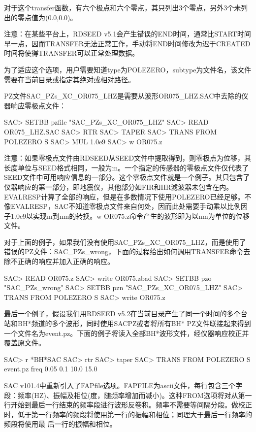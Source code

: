 对于这个transfer函数，有六个极点和六个零点，其只列出3个零点，另外3个未列出的零点值为(0.0,0.0)。

注意：在某些平台上，RDSEED v5.1会产生错误的END时间，通常比START时间早一点，因而TRANSFER无法正常工作，手动将END时间修改为迟于CREATED时间将使得TRANSFER可以正常处理数据。

为了适应这个选项，用户需要知道type为POLEZERO，subtype为文件名，该文件需要在当前目录或指定其绝对或相对路径。

PZ文件SAC\_PZs\_XC\_OR075\_LHZ是需要从波形OR075\_LHZ.SAC中去除的仪器响应零极点文件：
\begin{SACCode}
SAC> SETBB pzfile "SAC_PZs_XC_OR075_LHZ"
SAC> READ OR075_LHZ.SAC
SAC> RTR
SAC> TAPER
SAC> TRANS FROM POLEZERO S %
SAC> MUL 1.0e9
SAC> w OR075.z
\end{SACCode}
注意：如果零极点文件由RDSEED从SEED文件中提取得到，则零极点为位移，其长度单位与SEED格式相同，一般为m。一个指定的传感器的零极点文件仅代表了SEED文件中可用响应信息的一部分。这个零极点文件就是一个例子。其只包含了仪器响应的第一部分，即地震仪，其他部分如FIR和IIR滤波器未包含在内。EVALRESP计算了全部的响应，但是在多数情况下使用POLEZERO已经足够。不像EVALRESP，SAC不知道零极点文件来自何处，因而此处需要手动乘以比例因子1.0e9以实现m到nm的转换。w OR075.z命令产生的波形即为以nm为单位的位移文件。

对于上面的例子，如果我们没有使用SAC\_PZs\_XC\_OR075\_LHZ，而是使用了错误的PZ文件：SAC\_PZs\_wrong，下面的过程给出如何调用TRANSFER命令去除不正确的响应并加入正确的响应。
\begin{SACCode}
SAC> READ OR075.z
SAC> write OR075.zbad
SAC> SETBB pzo "SAC_PZs_wrong"
SAC> SETBB pzn "SAC_PZs_XC_OR075_LHZ"
SAC> TRANS FROM POLEZERO S %
SAC> write OR075.z
\end{SACCode}
最后一个例子，假设我们用RDSEED v5.2在当前目录产生了同一个时间的多个台站和BH*频道的多个波形，同时使用SACPZ或者将所有BH* PZ文件联接起来得到一个文件名为event.pz。下面的例子将读入全部BH*波形文件，经仪器响应校正并覆盖原文件。
\begin{SACCode}
SAC> r *BH*SAC
SAC> rtr
SAC> taper
SAC> TRANS FROM POLEZERO S event.pz freq 0.05 0.1 10.0 15.0
\end{SACCode}

SAC v101.4中重新引入了FAPfile选项。FAPFILE为ascii文件，每行包含三个字段：频率(HZ)、振幅及相位(度，随频率增加而减小)。这种FROM选项将对从第一行开始到最后一行结束的频率段进行波形反卷积。频率不需要等间隔分段。做校正时，低于第一行频率的频段将使用第一行的振幅和相位；同理大于最后一行频率的频段将使用最	后一行的振幅和相位。

